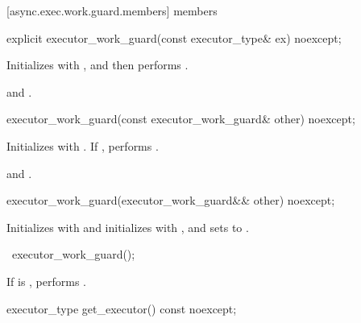 [async.exec.work.guard.members]{ members}

%
\begin{itemdecl}
explicit executor_work_guard(const executor_type& ex) noexcept;
\end{itemdecl}

\begin{itemdescr}
\pnum
\effects Initializes  with , and then performs .

\pnum
\postconditions {} and .
\end{itemdescr}

%
\begin{itemdecl}
executor_work_guard(const executor_work_guard& other) noexcept;
\end{itemdecl}

\begin{itemdescr}
\pnum
\effects Initializes  with . If , performs .

\pnum
\postconditions {} and .
\end{itemdescr}

%
\begin{itemdecl}
executor_work_guard(executor_work_guard&& other) noexcept;
\end{itemdecl}

\begin{itemdescr}
\pnum
\effects Initializes  with 
and initializes  with ,
and sets  to .
\end{itemdescr}

%
\begin{itemdecl}
~executor_work_guard();
\end{itemdecl}

\begin{itemdescr}
\pnum
\effects If  is , performs .
\end{itemdescr}

%
\begin{itemdecl}
executor_type get_executor() const noexcept;
\end{itemdecl}

